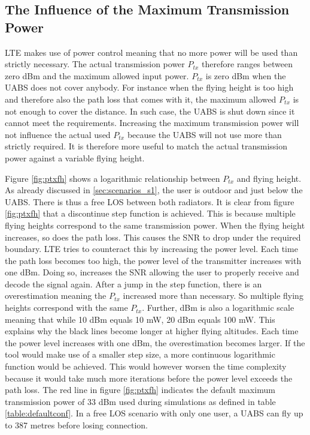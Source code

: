 \subsection{The Influence of the Maximum Transmission Power}
\label{s1a}
\gls{LTE} makes use of power control meaning that no more power will be used than strictly necessary. The actual 
transmission power $P_{tx}$ therefore ranges between zero dBm and the maximum allowed input power. $P_{tx}$ is zero dBm when the \gls{UABS} does not cover anybody.
For instance when the flying height is too high and therefore also the path loss that comes with it, the maximum allowed $P_{tx}$ is not enough to cover 
the distance. In such case, the \gls{UABS} is shut down since it cannot meet the requirements.
Increasing the maximum transmission power will not influence the actual used $P_{tx}$ because the \gls{UABS} will not use more
than strictly required. It is therefore more useful to match the actual transmission power against a variable flying height. 

Figure \ref{fig:ptxfh} shows a logarithmic relationship between $P_{tx}$ and flying height.
As already discussed in \ref{sec:scenarios_s1}, the user is outdoor and just below the \gls{UABS}. There is thus a free \gls{LOS} between both
radiators. It is clear from figure \ref{fig:ptxfh} that a discontinue step function is achieved. This is because multiple flying heights correspond to the same transmission power.
When the flying height increases, so does the path loss. This causes the \gls{SNR} to drop under the required boundary.
 \gls{LTE} tries to counteract this by increasing the power level. Each time 
the path loss becomes too high, the power level of the transmitter increases with one dBm. 
Doing so, increases the \gls{SNR} allowing the user to properly receive and decode the signal again.
After a jump in the step function, there is an overestimation meaning the $P_{tx}$ increased more than necessary. So multiple flying heights correspond with the same $P_{tx}$.
Further, dBm is also a logarithmic scale meaning that while 10 dBm equals 10 mW, 20 dBm equals 100 mW. This explains why the black lines become longer at higher flying altitudes.
Each time the power level increases with one dBm, the overestimation becomes larger. If the tool would make use of a smaller step size, a more continuous 
logarithmic function would be achieved. This would however worsen the time complexity because it would take much more iterations before 
the power level exceeds the path loss. 
The red line in figure \ref{fig:ptxfh} indicates the default maximum transmission power of 33 dBm used during simulations as 
defined in table \ref{table:defaultconf}. 
In a free \gls{LOS} scenario with only one user, a \gls{UABS} can fly up to 387 metres before losing connection.

